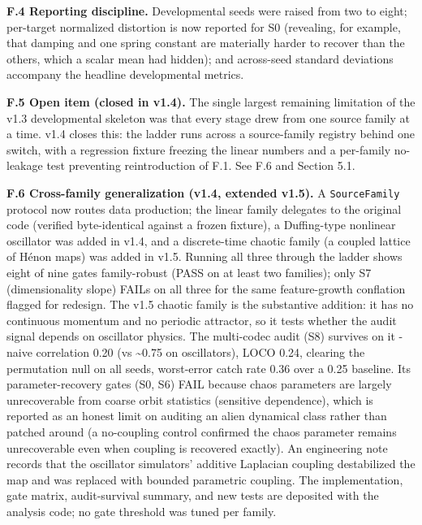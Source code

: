 \documentclass[
  11pt,
]{article}
\begin{document}
\textbf{F.4 Reporting discipline.} Developmental
seeds were raised from two to eight; per-target
normalized distortion is now reported for S0
(revealing, for example, that damping and one
spring constant are materially harder to recover
than the others, which a scalar mean had
hidden); and across-seed standard deviations
accompany the headline developmental metrics.

\textbf{F.5 Open item (closed in v1.4).} The
single largest remaining limitation of the v1.3
developmental skeleton was that every stage drew
from one source family at a time. v1.4 closes
this: the ladder runs across a source-family
registry behind one switch, with a regression
fixture freezing the linear numbers and a
per-family no-leakage test preventing
reintroduction of F.1. See F.6 and Section 5.1.

\textbf{F.6 Cross-family generalization (v1.4,
extended v1.5).} A \texttt{SourceFamily}
protocol now routes data production; the linear
family delegates to the original code (verified
byte-identical against a frozen fixture), a
Duffing-type nonlinear oscillator was added in
v1.4, and a discrete-time chaotic family (a
coupled lattice of Hénon maps) was added in
v1.5. Running all three through the ladder shows
eight of nine gates family-robust (PASS on at
least two families); only S7 (dimensionality
slope) FAILs on all three for the same
feature-growth conflation flagged for redesign.
The v1.5 chaotic family is the substantive
addition: it has no continuous momentum and no
periodic attractor, so it tests whether the
audit signal depends on oscillator physics. The
multi-codec audit (S8) survives on it - naive
correlation 0.20 (vs \textasciitilde0.75 on
oscillators), LOCO 0.24, clearing the
permutation null on all seeds, worst-error catch
rate 0.36 over a 0.25 baseline. Its
parameter-recovery gates (S0, S6) FAIL because
chaos parameters are largely unrecoverable from
coarse orbit statistics (sensitive dependence),
which is reported as an honest limit on auditing
an alien dynamical class rather than patched
around (a no-coupling control confirmed the
chaos parameter remains unrecoverable even when
coupling is recovered exactly). An engineering
note records that the oscillator simulators'
additive Laplacian coupling destabilized the map
and was replaced with bounded parametric
coupling. The implementation, gate matrix,
audit-survival summary, and new tests are
deposited with the analysis code; no gate
threshold was tuned per family.
\end{document}
